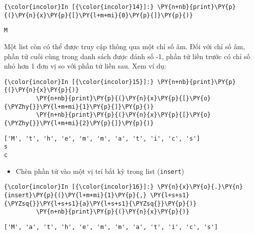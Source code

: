     
\begin{Verbatim}[commandchars=\\\{\}]
{\color{incolor}In [{\color{incolor}14}]:} \PY{n+nb}{print}\PY{p}{(}\PY{n}{x}\PY{p}{[}\PY{l+m+mi}{0}\PY{p}{]}\PY{p}{)}
\end{Verbatim}
    

    \begin{Verbatim}[commandchars=\\\{\}]
M

    \end{Verbatim}

    Một list còn có thể được truy cập thông qua một chỉ số âm. Đối với chỉ
số âm, phần tử cuối cùng trong danh sách được đánh số -1, phần tử liền
trước có chỉ số nhỏ hơn 1 đơn vị so với phần tử liền sau. Xem ví dụ:

    
\begin{Verbatim}[commandchars=\\\{\}]
{\color{incolor}In [{\color{incolor}15}]:} \PY{n+nb}{print}\PY{p}{(}\PY{n}{x}\PY{p}{)}
         \PY{n+nb}{print}\PY{p}{(}\PY{n}{x}\PY{p}{[}\PY{o}{\PYZhy{}}\PY{l+m+mi}{1}\PY{p}{]}\PY{p}{)}
         \PY{n+nb}{print}\PY{p}{(}\PY{n}{x}\PY{p}{[}\PY{o}{\PYZhy{}}\PY{l+m+mi}{2}\PY{p}{]}\PY{p}{)}
\end{Verbatim}
    

    \begin{Verbatim}[commandchars=\\\{\}]
['M', 't', 'h', 'e', 'm', 'm', 'a', 't', 'i', 'c', 's']
s
c

    \end{Verbatim}

    \begin{itemize}
\tightlist
\item
  Chèn phần tử vào một vị trí bất kỳ trong list (\texttt{insert})
\end{itemize}

    
\begin{Verbatim}[commandchars=\\\{\}]
{\color{incolor}In [{\color{incolor}16}]:} \PY{n}{x}\PY{o}{.}\PY{n}{insert}\PY{p}{(}\PY{l+m+mi}{1}\PY{p}{,} \PY{l+s+s1}{\PYZsq{}}\PY{l+s+s1}{a}\PY{l+s+s1}{\PYZsq{}}\PY{p}{)}
         \PY{n+nb}{print}\PY{p}{(}\PY{n}{x}\PY{p}{)}
\end{Verbatim}
    

    \begin{Verbatim}[commandchars=\\\{\}]
['M', 'a', 't', 'h', 'e', 'm', 'm', 'a', 't', 'i', 'c', 's']

    \end{Verbatim}

